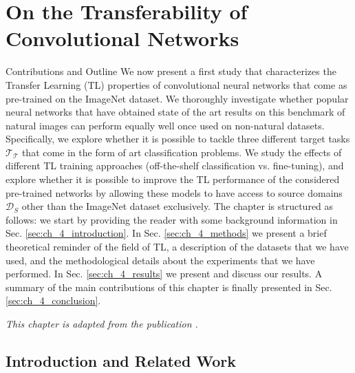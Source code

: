 \chapter{On the Transferability of Convolutional Networks}
\label{ch:tl_natural_to_non_natural}

\begin{remark}{Contributions and Outline} 
	We now present a first study that characterizes the Transfer Learning (TL) properties of convolutional neural networks that come as pre-trained on the ImageNet dataset. We thoroughly investigate whether popular neural networks that have obtained state of the art results on this benchmark of natural images can perform equally well once used on non-natural datasets. Specifically, we explore whether it is possible to tackle three different target tasks $\mathcal{T_T}$ that come in the form of art classification problems. We study the effects of different TL training approaches (off-the-shelf classification vs. fine-tuning), and explore whether it is possible to improve the TL performance of the considered pre-trained networks by allowing these models to have access to source domains $\mathcal{D}_S$ other than the ImageNet dataset exclusively. The chapter is structured as follows: we start by providing the reader with some background information in Sec. \ref{sec:ch_4_introduction}. In Sec. \ref{sec:ch_4_methods} we present a brief theoretical reminder of the field of TL, a description of the datasets that we have used, and the methodological details about the experiments that we have performed. In Sec. \ref{sec:ch_4_results} we present and discuss our results. A summary of the main contributions of this chapter is finally presented in Sec. \ref{sec:ch_4_conclusion}.

\vspace{5mm}
\textit{This chapter is adapted from the publication \citet{sabatelli2018deep}.}
\end{remark}



\iffalse
\section{Introduction and Related Work}
\label{sec:introduction}


